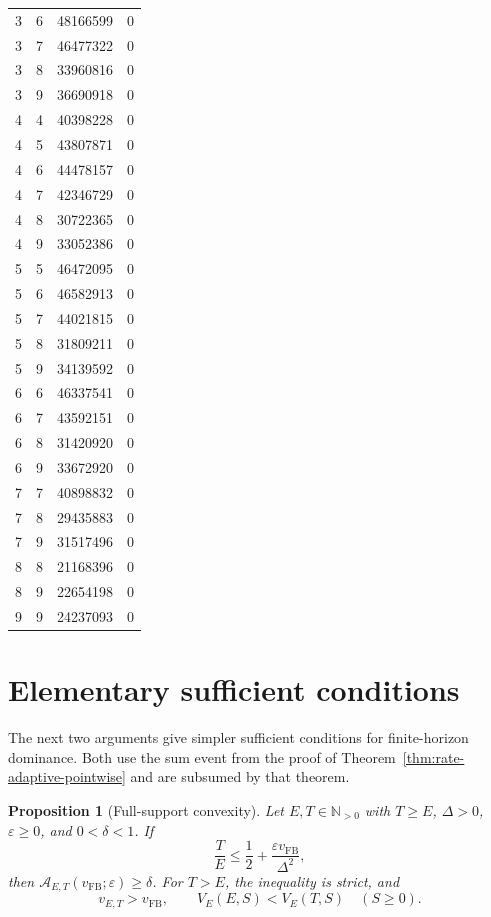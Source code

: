 \documentclass[11pt]{article}
\newtheorem{proposition}[theorem]{Proposition}
\theoremstyle{remark}
\newcommand{\N}{\mathbb N}
\begin{document}
\begin{longtable}{@{}rrrr@{}}
3 & 6 & 48166599 & 0 \\
3 & 7 & 46477322 & 0 \\
3 & 8 & 33960816 & 0 \\
3 & 9 & 36690918 & 0 \\
4 & 4 & 40398228 & 0 \\
4 & 5 & 43807871 & 0 \\
4 & 6 & 44478157 & 0 \\
4 & 7 & 42346729 & 0 \\
4 & 8 & 30722365 & 0 \\
4 & 9 & 33052386 & 0 \\
5 & 5 & 46472095 & 0 \\
5 & 6 & 46582913 & 0 \\
5 & 7 & 44021815 & 0 \\
5 & 8 & 31809211 & 0 \\
5 & 9 & 34139592 & 0 \\
6 & 6 & 46337541 & 0 \\
6 & 7 & 43592151 & 0 \\
6 & 8 & 31420920 & 0 \\
6 & 9 & 33672920 & 0 \\
7 & 7 & 40898832 & 0 \\
7 & 8 & 29435883 & 0 \\
7 & 9 & 31517496 & 0 \\
8 & 8 & 21168396 & 0 \\
8 & 9 & 22654198 & 0 \\
9 & 9 & 24237093 & 0 \\
\end{longtable}
\endgroup

\section{Elementary sufficient conditions}\label{app:elementary}
The next two arguments give simpler sufficient conditions for finite-horizon
dominance. Both use the sum event from the proof of
Theorem~\ref{thm:rate-adaptive-pointwise} and are subsumed by that theorem.

\begin{proposition}[Full-support convexity]\label{thm:near-full-accountant}
Let $E,T\in\N_{>0}$ with $T\geq E$, $\Delta>0$, $\varepsilon\geq0$, and
$0<\delta<1$. If
\begin{equation}\label{eq:nearfull-region}
 \frac TE\leq\frac12+\frac{\varepsilon v_{\mathrm{FB}}}{\Delta^2},
\end{equation}
then $\mathcal A_{E,T}(v_{\mathrm{FB}};\varepsilon)\geq\delta$.
For $T>E$, the inequality is strict, and
\[
 v_{E,T}>v_{\mathrm{FB}},\qquad
 V_E(E,S)<V_E(T,S)\quad(S\geq0).
\]
\end{proposition}
\end{document}
